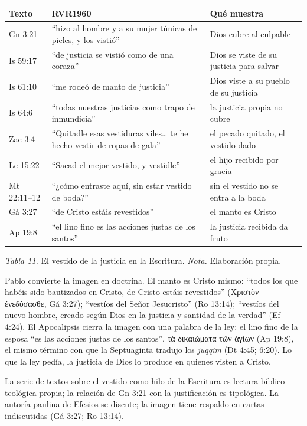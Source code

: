 \documentclass[11pt,letterpaper]{article}
\newcommand{\grc}[1]{\foreignlanguage{ancientgreek}{#1}}
\begin{document}
\begin{center}\small\renewcommand{\arraystretch}{1.22}
\begin{tabular}{@{}L{2.4cm}L{6.4cm}L{5.4cm}@{}}
\toprule
\textbf{Texto} & \textbf{RVR1960} & \textbf{Qué muestra} \\ \midrule
Gn 3:21 & ``hizo al hombre y a su mujer túnicas de pieles, y los vistió'' & Dios cubre al culpable \\
Is 59:17 & ``de justicia se vistió como de una coraza'' & Dios se viste de su justicia para salvar \\
Is 61:10 & ``me rodeó de manto de justicia'' & Dios viste a su pueblo de su justicia \\
Is 64:6 & ``todas nuestras justicias como trapo de inmundicia'' & la justicia propia no cubre \\
Zac 3:4 & ``Quitadle esas vestiduras viles\ldots{} te he hecho vestir de ropas de gala'' & el pecado quitado, el vestido dado \\
Lc 15:22 & ``Sacad el mejor vestido, y vestidle'' & el hijo recibido por gracia \\
Mt 22:11--12 & ``¿cómo entraste aquí, sin estar vestido de boda?'' & sin el vestido no se entra a la boda \\
Gá 3:27 & ``de Cristo estáis revestidos'' & el manto es Cristo \\
Ap 19:8 & ``el lino fino es las acciones justas de los santos'' & la justicia recibida da fruto \\
\bottomrule
\end{tabular}\par
{\footnotesize\color{gris}\textit{Tabla 11.} El vestido de la justicia en la Escritura. \textit{Nota.} Elaboración propia.}
\end{center}

Pablo convierte la imagen en doctrina. El manto es Cristo mismo: ``todos los que habéis sido bautizados en Cristo, de Cristo estáis revestidos'' (\grc{Χριστὸν ἐνεδύσασθε}, Gá 3:27); ``vestíos del Señor Jesucristo'' (Ro 13:14); ``vestíos del nuevo hombre, creado según Dios en la justicia y santidad de la verdad'' (Ef 4:24). El Apocalipsis cierra la imagen con una palabra de la ley: el lino fino de la esposa ``es las acciones justas de los santos'', \grc{τὰ δικαιώματα τῶν ἁγίων} (Ap 19:8), el mismo término con que la Septuaginta tradujo los \emph{juqqim} (Dt 4:45; 6:20). Lo que la ley pedía, la justicia de Dios lo produce en quienes visten a Cristo.

\begin{nota}[Precisión]
La serie de textos sobre el vestido como hilo de la Escritura es lectura bíblico-teológica propia; la relación de Gn 3:21 con la justificación es tipológica. La autoría paulina de Efesios se discute; la imagen tiene respaldo en cartas indiscutidas (Gá 3:27; Ro 13:14).
\end{nota}
\end{document}
